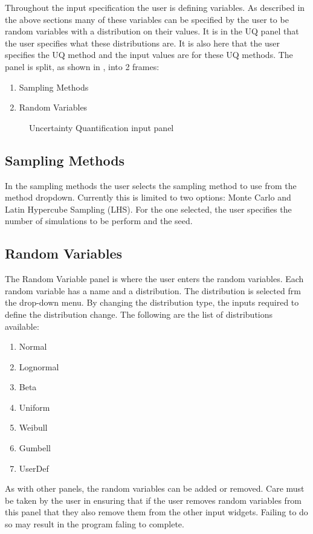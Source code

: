 Throughout the input specification the user is defining variables. As
described in the above sections many of these variables can be
specified by the user to be random variables with a distribution on
their values. It is in the UQ panel that the user specifies what these
distributions are.
It is also here that the user specifies the UQ method and the input
values are for these UQ methods.  The panel is split, as shown
in , into 2 frames:

\begin{enumerate}
\item Sampling Methods 
\item Random Variables
\end{enumerate}

\begin{figure}[!htbp]
  \caption{Uncertainty Quantification input panel}
  \label{fig:figure10}
\end{figure}

\subsection{Sampling Methods}
In the sampling methods the user selects the sampling method to use
from the method dropdown. Currently this is limited to two options:
Monte Carlo and Latin Hypercube Sampling (LHS). For the one selected,
the user specifies the number of simulations to be perform and the
seed.

\subsection{Random Variables}
The Random Variable panel is where the user enters the random
variables. Each random variable has a name and a distribution. The
distribution is selected frm the drop-down menu. By changing the
distribution type, the inputs required to define the distribution
change. The following are the list of distributions available:
\begin{enumerate}
\item Normal
\item Lognormal
\item Beta
\item Uniform
\item Weibull
\item Gumbell
\item UserDef
\end{enumerate} 

As with other panels, the random variables can be added or
removed. Care must be taken by the user in ensuring that if the user
removes random variables from this panel that they also remove them
from the other input widgets. Failing to do so may result in the
program faling to complete.
